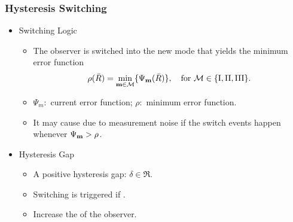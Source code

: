 \begin{frame} %
\frametitle{Hysteresis Switching}
\begin{itemize} 
\item Switching Logic
	\begin{itemize} 
	\item The observer is switched into the new mode that yields the minimum error function
		{\small\begin{gather*}
		\rho(\bar R)=\min_{\mathrm{\mathbf{m}}\in\mathcal{M}}\{\Psi_{\mathrm{\mathbf{m}}}(\bar R)\},\quad \text{for } \mathcal{M}\in\{\mathrm{I},\mathrm{II},\mathrm{III}\}.
		\end{gather*}}	
	\item $\Psi_m:$ current error function; $\rho:$ minimum error function.		
	\vspace*{0.1cm}	
	\item It may cause  due to measurement noise if the switch events happen whenever $\Psi_{\mathrm{\mathbf{m}}}>\rho$. 			
	\end{itemize}
\pause	
\vspace*{0.2cm}
\item Hysteresis Gap
	\begin{itemize}
	\item A positive hysteresis gap: $\delta\in\Re$. 
	\vspace*{0.1cm}
	\item Switching is triggered if  . 
	\vspace*{0.1cm}
	\item Increase the  of the observer.
	\end{itemize} 
\end{itemize} 		
\end{frame}   %





